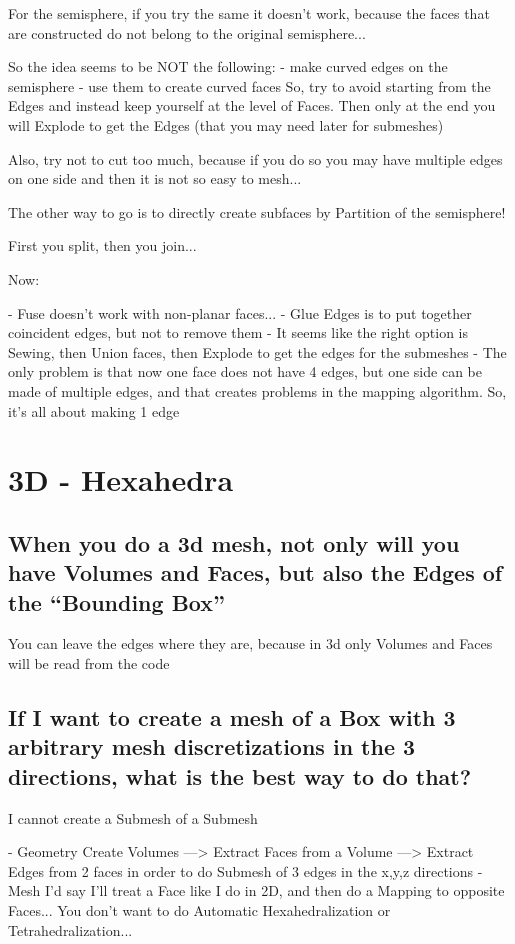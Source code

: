 \documentclass[10pt]{book}
\begin{document}
For the semisphere, if you try the same it doesn't work, because the faces that are constructed
do not belong to the original semisphere...

So the idea seems to be NOT the following:
 - make curved edges on the semisphere
 - use them to create curved faces
  So, try to avoid starting from the Edges and instead keep yourself at the level of Faces.
  Then only at the end you will Explode to get the Edges (that you may need later for submeshes)
  
  Also, try not to cut too much, because if you do so you may have multiple edges on one side and then it is not so easy to mesh...
 
 The other way to go is to directly create subfaces by Partition of the semisphere!
 
 First you split, then you join...
 
 Now:
 
 - Fuse doesn't work with non-planar faces...
 - Glue Edges is to put together coincident edges, but not to remove them
 - It seems like the right option is Sewing, then Union faces, then Explode to get the edges for the submeshes
 - The only problem is that now one face does not have 4 edges, but one side can be made of multiple edges,
   and that creates problems in the mapping algorithm. So, it's all about making 1 edge
   

\section{3D - Hexahedra}

\subsection{When you do a 3d mesh, not only will you have Volumes and Faces, but also the Edges of the ``Bounding Box''}

  You can leave the edges where they are, because in 3d only Volumes and Faces will be read from the code
 

 \subsection{If I want to create a mesh of a Box with 3 arbitrary mesh discretizations in the 3 directions,
  what is the best way to do that?}
  

I cannot create a Submesh of a Submesh

- Geometry
  Create Volumes
    ---> Extract Faces from a Volume
    ---> Extract Edges from 2 faces in order to do Submesh of 3 edges in the x,y,z directions
- Mesh 
  I'd say I'll treat a Face like I do in 2D, and then do a Mapping to opposite Faces...
  You don't want to do Automatic Hexahedralization or Tetrahedralization...
  
\end{document}
